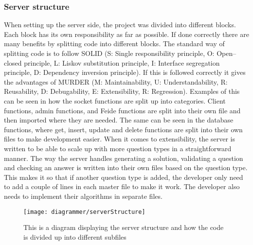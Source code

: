 \subsubsection{Server structure}
When setting up the server side, the project was divided into different blocks. Each block has its own responsibility as far as possible. If done correctly there are many benefits by splitting code into different blocks. The standard way of splitting code is to follow SOLID (S: Single responsibility principle, O: Open–closed principle, L: Liskov substitution principle, I: Interface segregation principle, D: Dependency inversion principle). If this is followed correctly it gives the advantages of MURDER (M: Maintainability, U: Understandability, R: Reusability, D: Debugability, E: Extensibility, R: Regression). Examples of this can be seen in how the socket functions are split up into categories. Client functions, admin functions, and Feide functions are split into their own file and then imported where they are needed. The same can be seen in the database functions, where get, insert, update and delete functions are split into their own files to make development easier. When it comes to extensibility, the server is written to be able to scale up with more question types in a straightforward manner. The way the server handles generating a solution, validating a question and checking an answer is written into their own files based on the question type. This makes it so that if another question type is added, the developer only need to add a couple of lines in each master file to make it work. The developer also needs to implement their algorithms in separate files.
\begin{figure}[H]
    \centering
    \texttt{[image: diagrammer/serverStructure]}
    \caption{This is a diagram displaying the server structure and how the code is divided up into different subfiles}
    \label{fig:serverStructure}
\end{figure}